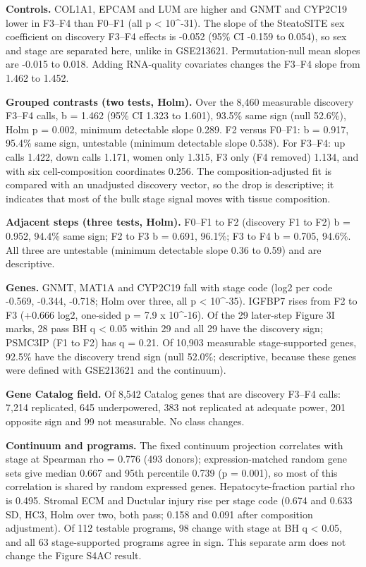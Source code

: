 \textbf{Controls.} COL1A1, EPCAM and LUM are higher and GNMT and CYP2C19 lower in F3--F4 than F0--F1 (all p \textless{} 10\^{}-31). The slope of the SteatoSITE sex coefficient on discovery F3--F4 effects is -0.052 (95\% CI -0.159 to 0.054), so sex and stage are separated here, unlike in GSE213621. Permutation-null mean slopes are -0.015 to 0.018. Adding RNA-quality covariates changes the F3--F4 slope from 1.462 to 1.452.

\textbf{Grouped contrasts (two tests, Holm).} Over the 8,460 measurable discovery F3--F4 calls, b = 1.462 (95\% CI 1.323 to 1.601), 93.5\% same sign (null 52.6\%), Holm p = 0.002, minimum detectable slope 0.289. F2 versus F0--F1: b = 0.917, 95.4\% same sign, untestable (minimum detectable slope 0.538). For F3--F4: up calls 1.422, down calls 1.171, women only 1.315, F3 only (F4 removed) 1.134, and with six cell-composition coordinates 0.256. The composition-adjusted fit is compared with an unadjusted discovery vector, so the drop is descriptive; it indicates that most of the bulk stage signal moves with tissue composition.

\textbf{Adjacent steps (three tests, Holm).} F0--F1 to F2 (discovery F1 to F2) b = 0.952, 94.4\% same sign; F2 to F3 b = 0.691, 96.1\%; F3 to F4 b = 0.705, 94.6\%. All three are untestable (minimum detectable slope 0.36 to 0.59) and are descriptive.

\textbf{Genes.} GNMT, MAT1A and CYP2C19 fall with stage code (log2 per code -0.569, -0.344, -0.718; Holm over three, all p \textless{} 10\^{}-35). IGFBP7 rises from F2 to F3 (+0.666 log2, one-sided p = 7.9 x 10\^{}-16). Of the 29 later-step Figure 3I marks, 28 pass BH q \textless{} 0.05 within 29 and all 29 have the discovery sign; PSMC3IP (F1 to F2) has q = 0.21. Of 10,903 measurable stage-supported genes, 92.5\% have the discovery trend sign (null 52.0\%; descriptive, because these genes were defined with GSE213621 and the continuum).

\textbf{Gene Catalog field.} Of 8,542 Catalog genes that are discovery F3--F4 calls: 7,214 replicated, 645 underpowered, 383 not replicated at adequate power, 201 opposite sign and 99 not measurable. No class changes.

\textbf{Continuum and programs.} The fixed continuum projection correlates with stage at Spearman rho = 0.776 (493 donors); expression-matched random gene sets give median 0.667 and 95th percentile 0.739 (p = 0.001), so most of this correlation is shared by random expressed genes. Hepatocyte-fraction partial rho is 0.495. Stromal ECM and Ductular injury rise per stage code (0.674 and 0.633 SD, HC3, Holm over two, both pass; 0.158 and 0.091 after composition adjustment). Of 112 testable programs, 98 change with stage at BH q \textless{} 0.05, and all 63 stage-supported programs agree in sign. This separate arm does not change the Figure S4AC result.

